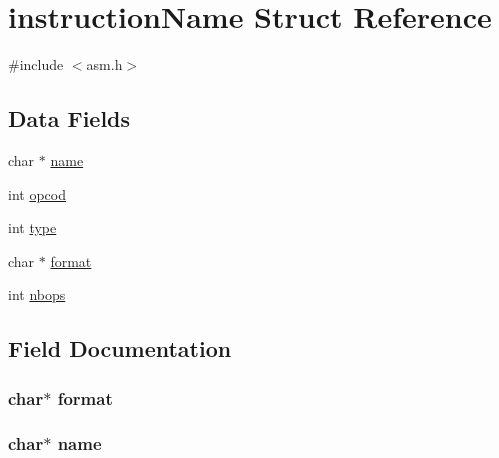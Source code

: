 \hypertarget{structinstruction_name}{}\section{instruction\+Name Struct Reference}
\label{structinstruction_name}


{\ttfamily \#include $<$asm.\+h$>$}

\subsection*{Data Fields}
\begin{DoxyCompactItemize}
\item 
char $\ast$ \hyperlink{structinstruction_name_a5ac083a645d964373f022d03df4849c8}{name}
\item 
int \hyperlink{structinstruction_name_a87e59bd69d9de26089c9d13e5c75c086}{opcod}
\item 
int \hyperlink{structinstruction_name_ac765329451135abec74c45e1897abf26}{type}
\item 
char $\ast$ \hyperlink{structinstruction_name_a5407a229a5e1a319d75fb29542c83eae}{format}
\item 
int \hyperlink{structinstruction_name_a34aaf7e4790814fce09b357e1de1a4da}{nbops}
\end{DoxyCompactItemize}


\subsection{Field Documentation}
\subsubsection[{\texorpdfstring{format}{format}}]{\setlength{\rightskip}{0pt plus 5cm}char$\ast$ format}\hypertarget{structinstruction_name_a5407a229a5e1a319d75fb29542c83eae}{}\label{structinstruction_name_a5407a229a5e1a319d75fb29542c83eae}
\subsubsection[{\texorpdfstring{name}{name}}]{\setlength{\rightskip}{0pt plus 5cm}char$\ast$ name}\hypertarget{structinstruction_name_a5ac083a645d964373f022d03df4849c8}{}\label{structinstruction_name_a5ac083a645d964373f022d03df4849c8}
